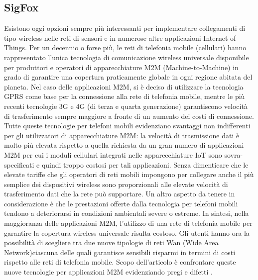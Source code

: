 \documentclass[a4paper]{report} %
\begin{document}
\subsection{SigFox}
Esistono oggi opzioni sempre più interessanti per implementare collegamenti di tipo wireless nelle reti di sensori e in numerose altre applicazioni Internet of Things. Per un decennio o forse più, le reti di telefonia mobile (cellulari) hanno rappresentato l'unica tecnologia di comunicazione wireless universale disponibile per produttori e operatori di apparecchiature M2M (Machine-to-Machine) in grado di garantire una copertura praticamente globale in ogni regione abitata del pianeta. Nel caso delle applicazioni M2M, si è deciso di utilizzare la tecnologia GPRS come base per la connessione alla rete di telefonia mobile, mentre le più recenti tecnologie 3G e 4G (di terza e quarta generazione) garantiscono velocità di trasferimento sempre maggiore a fronte di un aumento dei costi di connessione. Tutte queste tecnologie per telefoni mobili evidenziano svantaggi non indifferenti per gli utilizzatori di apparecchiature M2M: la velocità di trasmissione dati è molto più elevata rispetto a quella richiesta da un gran numero di applicazioni M2M per cui i moduli cellulari integrati nelle apparecchiature IoT sono sovra-specificati e quindi troppo costosi per tali applicazioni. Senza dimenticare che le elevate tariffe che gli operatori di reti mobili impongono per collegare anche il più semplice dei dispositivi wireless sono proporzionali alle elevate velocità di trasferimento dati che la rete può supportare. Un altro aspetto da tenere in considerazione è che le prestazioni offerte dalla tecnologia per telefoni mobili tendono a deteriorarsi in condizioni ambientali severe o estreme. In sintesi, nella maggioranza delle applicazioni M2M, l'utilizzo di una rete di telefonia mobile per garantire la copertura wireless universale risulta costoso. Gli utenti hanno ora la possibilità di scegliere tra due nuove tipologie di reti Wan (Wide Area Network)ciascuna delle quali garantisce sensibili risparmi in termini di costi rispetto alle reti di telefonia mobile. Scopo dell'articolo è confrontare queste nuove tecnologie per applicazioni M2M evidenziando pregi e difetti \cite{art:rif.23}.
\end{document}
